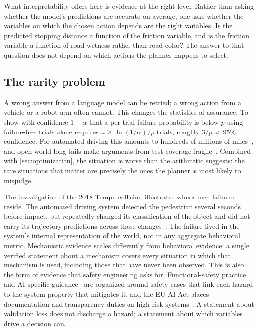 \documentclass[11pt]{article}
\theoremstyle{definition}\newtheorem{definition}{Definition}
\begin{document}
What interpretability offers here is evidence at the right level. Rather than asking whether the model's predictions are accurate on average, one asks whether the variables on which the chosen action depends are the right variables. Is the predicted stopping distance a function of the friction variable, and is the friction variable a function of road wetness rather than road color? The answer to that question does not depend on which actions the planner happens to select.

\subsection{The rarity problem}\label{sec:rarity}
A wrong answer from a language model can be retried; a wrong action from a vehicle or a robot arm often cannot. This changes the statistics of assurance. To show with confidence $1-\alpha$ that a per-trial failure probability is below $p$ using failure-free trials alone requires $n\ge\ln(1/\alpha)/p$ trials, roughly $3/p$ at 95\% confidence. For automated driving this amounts to hundreds of millions of miles~\citep{kalra2016driving}, and open-world long tails make arguments from test coverage fragile~\citep{koopman2016challenges}. Combined with \cref{sec:optimization}, the situation is worse than the arithmetic suggests: the rare situations that matter are precisely the ones the planner is most likely to misjudge.

The investigation of the 2018 Tempe collision illustrates where such failures reside. The automated driving system detected the pedestrian several seconds before impact, but repeatedly changed its classification of the object and did not carry its trajectory predictions across those changes~\citep{ntsb2019uber}. The failure lived in the system's internal representation of the world, not in any aggregate behavioral metric. Mechanistic evidence scales differently from behavioral evidence: a single verified statement about a mechanism covers every situation in which that mechanism is used, including those that have never been observed. This is also the form of evidence that safety engineering asks for. Functional-safety practice and AI-specific guidance~\citep{iso26262,iso8800,ul4600} are organized around safety cases that link each hazard to the system property that mitigates it, and the EU AI Act places documentation and transparency duties on high-risk systems~\citep{euaiact2024}. A statement about validation loss does not discharge a hazard; a statement about which variables drive a decision can.
\end{document}
